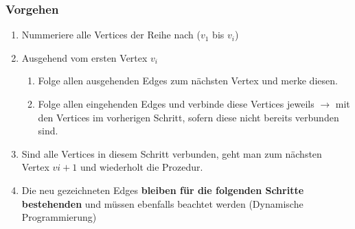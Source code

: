 \subsubsection{Vorgehen}
\begin{enumerate}
	\item Nummeriere alle Vertices der Reihe nach ($v_1$ bis $v_i$)
	\item Ausgehend vom ersten Vertex $v_i$ 
	\begin{enumerate}
		\item Folge allen ausgehenden Edges zum nächsten Vertex und merke diesen.
		\item Folge allen eingehenden Edges und verbinde diese Vertices jeweils $\rightarrow$ mit den Vertices im vorherigen Schritt, sofern diese nicht bereits verbunden sind.
	\end{enumerate}
	\item Sind alle Vertices in diesem Schritt verbunden, geht man zum nächsten Vertex $v{i+1}$ und wiederholt die Prozedur. 
	\item Die neu gezeichneten Edges \textbf{bleiben für die folgenden Schritte bestehenden} und müssen ebenfalls beachtet werden (Dynamische Programmierung)
\end{enumerate}

